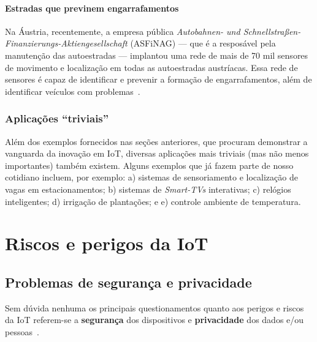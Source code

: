 \documentclass[pdftex, brazil, 12pt, twoside]{article}
\newcommand{\ingles}[1]{\textit{#1}}
\begin{document}
\paragraph{Estradas que previnem engarrafamentos} Na Áustria, recentemente,
a empresa pública \ingles{Autobahnen- und Schnellstraßen-Finanzierungs-Aktiengesellschaft} (ASFiNAG) --- que
é a resposável pela manutenção das autoestradas --- implantou uma
rede de mais de 70 mil sensores de movimento e localização em todas as autoestradas
austríacas. Essa rede de sensores é capaz de identificar e prevenir
a formação de engarrafamentos, além de identificar veículos com
problemas~\citep{ASFiNAGIoT2015}.


\subsubsection{Aplicações ``triviais''}
\label{aplicacoes-iot-exemplos-triviais}

Além dos exemplos fornecidos nas seções anteriores, que procuram demonstrar a
vanguarda da inovação em IoT, diversas aplicações mais triviais (mas não menos
importantes) também existem. Alguns exemplos que já fazem parte de nosso cotidiano
incluem, por exemplo: a) sistemas de sensoriamento e localização de vagas em
estacionamentos; b) sistemas de \ingles{Smart-TVs} interativas; c) relógios
inteligentes; d) irrigação de plantações; e e) controle ambiente de temperatura.



\section{Riscos e perigos da IoT}
\label{perigos-iot}


\subsection{Problemas de segurança e privacidade}
\label{perigos-iot-seguranca-privacidade}

Sem dúvida nenhuma os principais questionamentos quanto aos perigos e riscos
da IoT referem-se a \textbf{segurança} dos dispositivos e \textbf{privacidade} dos
dados e/ou pessoas~\citep{BauerMcKinseyIotSecurity2017,HuSecurityIoT2016,SANSMilleyIoT2017,SansPescatoreIoT2014,SANSRivasIoT2017,RussellIoTSecurity2016}.
\end{document}
